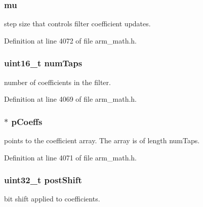 \subsubsection[{\texorpdfstring{mu}{mu}}]{ mu}\hypertarget{structarm__lms__instance__q31_a21ab4237a726ea7751f5026d89d2e577}{}\label{structarm__lms__instance__q31_a21ab4237a726ea7751f5026d89d2e577}
step size that controls filter coefficient updates. 

Definition at line 4072 of file arm\+\_\+math.\+h.

\subsubsection[{\texorpdfstring{num\+Taps}{numTaps}}]{\setlength{\rightskip}{0pt plus 5cm}uint16\+\_\+t num\+Taps}\hypertarget{structarm__lms__instance__q31_a751941891e47f522a7f5375fe8990aac}{}\label{structarm__lms__instance__q31_a751941891e47f522a7f5375fe8990aac}
number of coefficients in the filter. 

Definition at line 4069 of file arm\+\_\+math.\+h.

\subsubsection[{\texorpdfstring{p\+Coeffs}{pCoeffs}}]{$\ast$ p\+Coeffs}\hypertarget{structarm__lms__instance__q31_a68888e36167d81cb7836db10367a1682}{}\label{structarm__lms__instance__q31_a68888e36167d81cb7836db10367a1682}
points to the coefficient array. The array is of length num\+Taps. 

Definition at line 4071 of file arm\+\_\+math.\+h.

\subsubsection[{\texorpdfstring{post\+Shift}{postShift}}]{\setlength{\rightskip}{0pt plus 5cm}uint32\+\_\+t post\+Shift}\hypertarget{structarm__lms__instance__q31_aa2cacddfc5e1d86905d7d31a18b1979b}{}\label{structarm__lms__instance__q31_aa2cacddfc5e1d86905d7d31a18b1979b}
bit shift applied to coefficients. 

